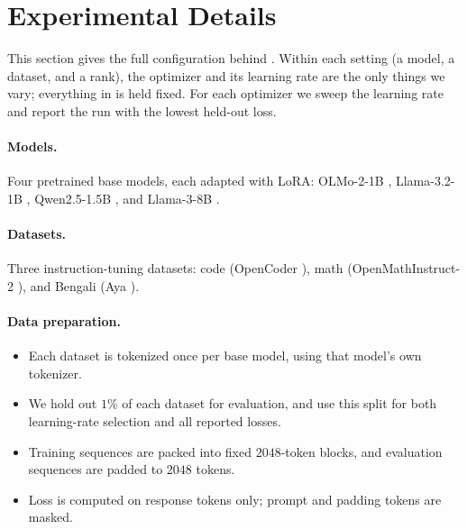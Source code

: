 \documentclass[11pt]{article}
\begin{document}
\section{Experimental Details}
\label{app:exp}
This section gives the full configuration behind . Within each setting (a model, a dataset, and a rank), the optimizer and its learning rate are the only things we vary; everything in  is held fixed. For each optimizer we sweep the learning rate and report the run with the lowest held-out loss.

\paragraph{Models.} Four pretrained base models, each adapted with LoRA: OLMo-2-1B \cite{olmo2}, Llama-3.2-1B \cite{llama3}, Qwen2.5-1.5B \cite{qwen25}, and Llama-3-8B \cite{llama3}.

\paragraph{Datasets.} Three instruction-tuning datasets: code (OpenCoder \cite{opencoder}), math (OpenMathInstruct-2 \cite{openmathinstruct2}), and Bengali (Aya \cite{aya}).

\paragraph{Data preparation.}
\begin{itemize}[leftmargin=1.5em,itemsep=1pt,topsep=2pt]
  \item Each dataset is tokenized once per base model, using that model's own tokenizer.
  \item We hold out $1\%$ of each dataset for evaluation, and use this split for both learning-rate selection and all reported losses.
  \item Training sequences are packed into fixed $2048$-token blocks, and evaluation sequences are padded to $2048$ tokens.
  \item Loss is computed on response tokens only; prompt and padding tokens are masked.
\end{itemize}
\end{document}

